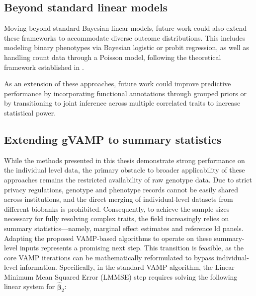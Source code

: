 \subsection{Beyond standard linear models}

Moving beyond standard Bayesian linear models, future work could also extend these frameworks to accommodate diverse outcome distributions. This includes modeling binary phenotypes via Bayesian logistic or probit regression, as well as handling count data through a Poisson model, following the theoretical framework established in \cite{schniter_vector_2016}.


As an extension of these approaches, future work could improve predictive performance by incorporating functional annotations through grouped priors \cite{bayesrc} or by transitioning to joint inference across multiple correlated traits to increase statistical power.

\subsection{Extending gVAMP to summary statistics}

While the methods presented in this thesis demonstrate strong performance on the individual level data, the primary obstacle to broader applicability of these approaches remains the restricted availability of raw genotype data. Due to strict privacy regulations, genotype and phenotype records cannot be easily shared across institutions, and the direct merging of individual-level datasets from different biobanks is prohibited. Consequently, to achieve the sample sizes necessary for fully resolving complex traits, the field increasingly relies on summary statistics---namely, marginal effect estimates and reference \gls{ld} panels. Adapting the proposed VAMP-based algorithms to operate on these summary-level inputs represents a promising next step. This transition is feasible, as the core VAMP iterations can be mathematically reformulated to bypass individual-level information. Specifically, in the standard VAMP algorithm, the Linear Minimum Mean Squared Error (LMMSE) step requires solving the following linear system for $\hat{\bm{\beta}}_2$:

